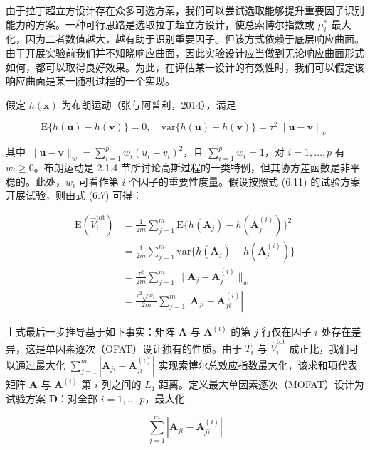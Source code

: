 \documentclass{ctexart}
\begin{document}
由于拉丁超立方设计存在众多可选方案，我们可以尝试选取能够提升重要因子识别能力的方案。一种可行思路是选取拉丁超立方设计，使总索博尔指数或 $\mu^*_i$ 最大化，因为二者数值越大，越有助于识别重要因子。但该方式依赖于底层响应曲面。由于开展实验前我们并不知晓响应曲面，因此实验设计应当做到无论响应曲面形式如何，都可以取得良好效果。为此，在评估某一设计的有效性时，我们可以假定该响应曲面是某一随机过程的一个实现。

假定 $h(\boldsymbol{x})$ 为布朗运动（张与阿普利，2014），满足

\begin{equation*}
\mathrm{E}\{h(\boldsymbol{u})-h(\boldsymbol{v})\}=0,\quad\mathrm{var}\{h(\boldsymbol{u})-h(\boldsymbol{v})\}=\tau^{2}\|\boldsymbol{u}-\boldsymbol{v}\|_{w}
\tag{6.12}
\end{equation*}

其中 $\|\boldsymbol{u}-\boldsymbol{v}\|_{w}=\sum_{i=1}^{p}w_{i}(u_{i}-v_{i})^{2}$，且 $\sum_{i=1}^{p}w_{i}=1$，对 $i=1,\dots,p$ 有 $w_{i}\ge0$。布朗运动是 2.1.4 节所讨论高斯过程的一类特例，但其协方差函数是非平稳的。此处，$w_{i}$ 可看作第 $i$ 个因子的重要性度量。假设按照式 (6.11) 的试验方案开展试验，则由式 (6.7) 可得：

\begin{align*}
\mathrm{E}(\widehat{V}_{i}^{\mathrm{tot}})&=\frac{1}{2m}\sum_{j=1}^{m}\mathrm{E}\{h(\boldsymbol{A}_{j})-h(\boldsymbol{A}_{j}^{(i)})\}^{2}\\
&=\frac{1}{2m}\sum_{j=1}^{m}\mathrm{var}\{h(\boldsymbol{A}_{j})-h(\boldsymbol{A}_{j}^{(i)})\}\\
&=\frac{\tau^{2}}{2m}\sum_{j=1}^{m}\|\boldsymbol{A}_{j}-\boldsymbol{A}_{j}^{(i)}\|_{w}\\
&=\frac{\tau^{2}\sqrt{w_{i}}}{2m}\sum_{j=1}^{m}|\boldsymbol{A}_{ji}-\boldsymbol{A}_{ji}^{(i)}|
\tag{6.13}
\end{align*}

上式最后一步推导基于如下事实：矩阵 $\boldsymbol{A}$ 与 $\boldsymbol{A}^{(i)}$ 的第 $j$ 行仅在因子 $i$ 处存在差异，这是单因素逐次（OFAT）设计独有的性质。由于 $\widehat{T}_{i}$ 与 $\widehat{V}_{i}^{\mathrm{tot}}$ 成正比，我们可以通过最大化 $\sum_{j=1}^{m}|\boldsymbol{A}_{ji}-\boldsymbol{A}_{ji}^{(i)}|$ 实现索博尔总效应指数最大化，该求和项代表矩阵 $\boldsymbol{A}$ 与 $\boldsymbol{A}^{(i)}$ 第 $i$ 列之间的 $L_1$ 距离。定义最大单因素逐次（MOFAT）设计为试验方案 $\boldsymbol{D}$：对全部 $i=1,\dots,p$，最大化

\begin{equation*}
\sum_{j=1}^{m}|\boldsymbol{A}_{ji}-\boldsymbol{A}_{ji}^{(i)}|
\end{equation*}
\end{document}
